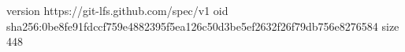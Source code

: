 version https://git-lfs.github.com/spec/v1
oid sha256:0be8fe91fdccf759e4882395f5ea126c50d3be5ef2632f26f79db756e8276584
size 448
